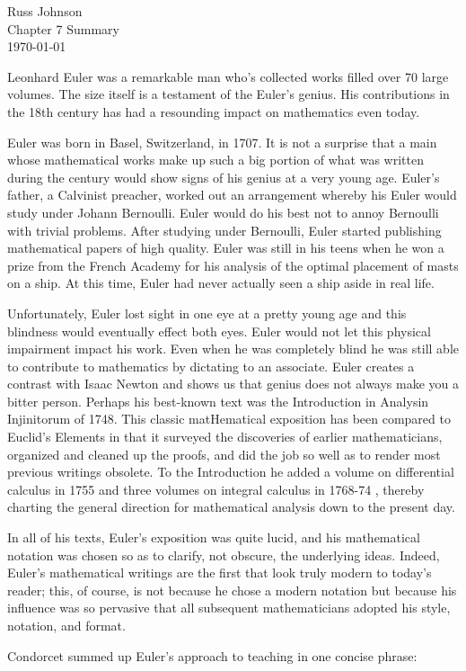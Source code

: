 \documentclass[12pt]{article}
\begin{document}
\begin{flushright}
Russ Johnson\\
Chapter 7 Summary\\
\today\\
\end{flushright}

\begin{doublespace}

Leonhard Euler was a remarkable man who's collected works filled over 70 large volumes. The size itself is a testament of the Euler's genius. His contributions in the 18th century has had a resounding impact on mathematics even today.

Euler was born in Basel, Switzerland, in 1707. It is not a surprise that a main whose mathematical works make up such a big portion of what was written during the century would show signs of his genius at a very young age. Euler's father, a Calvinist preacher, worked out an arrangement whereby his Euler would study under Johann Bernoulli. Euler would do his best not to annoy Bernoulli with trivial problems. After studying under Bernoulli, Euler started publishing mathematical papers of high quality. Euler was still in his teens when he won a prize from the French Academy for his analysis of the optimal placement of masts on a ship. At this time, Euler had never actually seen a ship aside in real life.

Unfortunately, Euler lost sight in one eye at a pretty young age and this blindness would eventually effect both eyes. Euler would not let this physical impairment impact his work. Even when he was completely blind he was still able to contribute to mathematics by dictating to an associate. Euler creates a contrast with Isaac Newton and shows us that genius does not always make you a bitter person. Perhaps his best-known text was the Introduction in Analysin Injinitorum of 1748. This classic matHematical exposition    
has been compared to Euclid's Elements in that it surveyed the discov­eries of earlier mathematicians, organized and cleaned up the proofs, and did the job so well as to render most previous writings obsolete. To the Introduction he added a volume on differential calculus in 1755 and    
three volumes on integral calculus in 1768-74 , thereby charting the gen­eral direction for mathematical analysis down to the present day.

In all of his texts, Euler's exposition was quite lucid, and his mathe­matical notation was chosen so as to clarify, not obscure, the underlying ideas. Indeed, Euler's mathematical writings are the first that look truly modern to today's reader; this, of course, is not because he chose a mod­ern notation but because his influence was so pervasive that all subse­quent mathematicians adopted his style, notation, and format.

Condorcet summed up Euler's approach to teaching in one concise phrase:

\end{doublespace}
\end{document}
